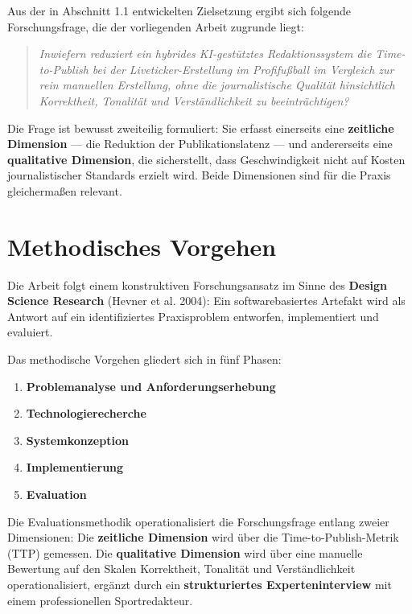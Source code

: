 \documentclass[12pt,a4paper,notitlepage,ngerman]{report}
\begin{document}
Aus der in Abschnitt 1.1 entwickelten Zielsetzung ergibt sich folgende Forschungsfrage, die der vorliegenden Arbeit zugrunde liegt:

\begin{quote}
\textit{Inwiefern reduziert ein hybrides KI-gestütztes Redaktionssystem die Time-to-Publish bei der Liveticker-Erstellung im Profifußball im Vergleich zur rein manuellen Erstellung, ohne die journalistische Qualität hinsichtlich Korrektheit, Tonalität und Verständlichkeit zu beeinträchtigen?}
\end{quote}

Die Frage ist bewusst zweiteilig formuliert: Sie erfasst einerseits eine \textbf{zeitliche Dimension} — die Reduktion der Publikationslatenz — und andererseits eine \textbf{qualitative Dimension}, die sicherstellt, dass Geschwindigkeit nicht auf Kosten journalistischer Standards erzielt wird. Beide Dimensionen sind für die Praxis gleichermaßen relevant.

\section{Methodisches Vorgehen}

Die Arbeit folgt einem konstruktiven Forschungsansatz im Sinne des \textbf{Design Science Research} (Hevner et al. 2004): Ein softwarebasiertes Artefakt wird als Antwort auf ein identifiziertes Praxisproblem entworfen, implementiert und evaluiert.

Das methodische Vorgehen gliedert sich in fünf Phasen:

\begin{enumerate}
    \item \textbf{Problemanalyse und Anforderungserhebung}
    \item \textbf{Technologierecherche}
    \item \textbf{Systemkonzeption}
    \item \textbf{Implementierung}
    \item \textbf{Evaluation}
\end{enumerate}

Die Evaluationsmethodik operationalisiert die Forschungsfrage entlang zweier Dimensionen: Die \textbf{zeitliche Dimension} wird über die Time-to-Publish-Metrik (TTP) gemessen. Die \textbf{qualitative Dimension} wird über eine manuelle Bewertung auf den Skalen Korrektheit, Tonalität und Verständlichkeit operationalisiert, ergänzt durch ein \textbf{strukturiertes Experteninterview} mit einem professionellen Sportredakteur.
\end{document}
